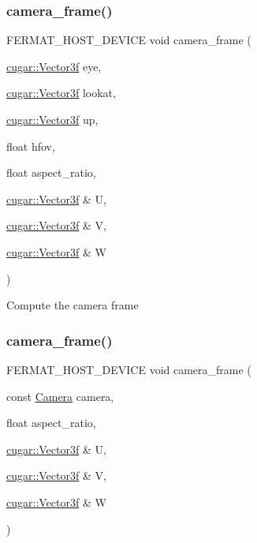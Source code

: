 \subsubsection{\texorpdfstring{camera\+\_\+frame()}{camera\_frame()}\hspace{0.1cm}{\footnotesize\ttfamily [1/2]}}
{\footnotesize\ttfamily F\+E\+R\+M\+A\+T\+\_\+\+H\+O\+S\+T\+\_\+\+D\+E\+V\+I\+CE void camera\+\_\+frame (\begin{DoxyParamCaption}\item[{\hyperlink{structcugar_1_1_vector}{cugar\+::\+Vector3f}}]{eye,  }\item[{\hyperlink{structcugar_1_1_vector}{cugar\+::\+Vector3f}}]{lookat,  }\item[{\hyperlink{structcugar_1_1_vector}{cugar\+::\+Vector3f}}]{up,  }\item[{float}]{hfov,  }\item[{float}]{aspect\+\_\+ratio,  }\item[{\hyperlink{structcugar_1_1_vector}{cugar\+::\+Vector3f} \&}]{U,  }\item[{\hyperlink{structcugar_1_1_vector}{cugar\+::\+Vector3f} \&}]{V,  }\item[{\hyperlink{structcugar_1_1_vector}{cugar\+::\+Vector3f} \&}]{W }\end{DoxyParamCaption})\hspace{0.3cm}{\ttfamily [inline]}}

Compute the camera frame \mbox{\label{group___camera_module_gae03035f4349487f47612fdccf6644826}} 
\subsubsection{\texorpdfstring{camera\+\_\+frame()}{camera\_frame()}\hspace{0.1cm}{\footnotesize\ttfamily [2/2]}}
{\footnotesize\ttfamily F\+E\+R\+M\+A\+T\+\_\+\+H\+O\+S\+T\+\_\+\+D\+E\+V\+I\+CE void camera\+\_\+frame (\begin{DoxyParamCaption}\item[{const \hyperlink{struct_camera}{Camera}}]{camera,  }\item[{float}]{aspect\+\_\+ratio,  }\item[{\hyperlink{structcugar_1_1_vector}{cugar\+::\+Vector3f} \&}]{U,  }\item[{\hyperlink{structcugar_1_1_vector}{cugar\+::\+Vector3f} \&}]{V,  }\item[{\hyperlink{structcugar_1_1_vector}{cugar\+::\+Vector3f} \&}]{W }\end{DoxyParamCaption})\hspace{0.3cm}{\ttfamily [inline]}}

